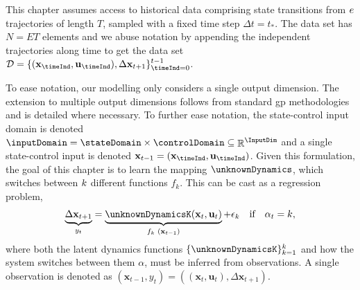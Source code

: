 \documentclass{mimosis-class/mimosis}
\numberwithin{equation}{chapter}
\DeclareMathOperator{\R}{\mathbb{R}}
\newcommand{\numData}{\ensuremath{t}}
\newcommand{\numEpisodes}{\ensuremath{e}}
\newcommand{\modeInd}{\ensuremath{k}}
\newcommand{\NumData}{\ensuremath{\MakeUppercase{\numData}}}
\newcommand{\ModeInd}{\ensuremath{\MakeUppercase{\modeInd}}}
\newcommand{\NumEpisodes}{\MakeUppercase{\numEpisodes}}
\newcommand{\singleData}[1]{\ensuremath{#1_{\numData}}}
\newcommand{\mode}[1]{\ensuremath{#1_{\modeInd}}}
\newcommand{\state}{\ensuremath{\mathbf{x}}}
\newcommand{\control}{\ensuremath{\mathbf{u}}}
\newcommand{\x}{\ensuremath{\mathbf{x}}}
\newcommand{\y}{\ensuremath{y}}
\newcommand{\singleInput}{\ensuremath{\x_{\numData-1}}}
\newcommand{\singleOutput}{\ensuremath{\singleData{\y}}}
\newcommand{\modeVar}{\ensuremath{\alpha}}
\newcommand{\modeVarn}{\ensuremath{\singleData{\modeVar}}}
\newcommand{\modeVarK}{\ensuremath{\modeVarn=\modeInd}}
\newcommand{\latentFunc}{\ensuremath{f}}
\begin{document}
This chapter assumes access to historical data comprising state transitions from \(\NumEpisodes\) trajectories
of length \(T\), sampled  with a  fixed  time step \(\Delta t=t_{*}\).
The data set has \({N=ET}\) elements
and we abuse notation by appending the independent trajectories along
time to get the data set
\(\mathcal{D}=\{(\state_{\timeInd},\control_{\timeInd}),\Delta \state_{t+1}\}^{\NumData-1}_{\timeInd=0}\).

To ease notation, our modelling only considers a single output dimension.
The extension to multiple output dimensions follows from standard \acrshort{gp} methodologies and is detailed where necessary.
To further ease notation, the state-control input domain is denoted
\(\inputDomain = \stateDomain \times \controlDomain \subseteq \R^{\InputDim}\)
and a single state-control input is denoted
\(\singleInput = (\state_{\timeInd},\control_{\timeInd})\).
Given this formulation, the goal of this chapter is to learn the mapping \(\unknownDynamics\),
which switches between \(\ModeInd\) different functions \(\mode{\latentFunc}\).
This can be cast as a regression problem,
\begin{align} \label{eq-multimodal-dynamics-disc-regression}
\underbrace{\Delta \state_{t+1}}_{\text{\singleOutput}}
= \underbrace{\unknownDynamicsK(\state_{t}, \control_{t})}_{\text{\mode{\latentFunc} (\singleInput)}}
+ \mode{\epsilon}
\quad \text{if} \quad \modeVarK,
\end{align}
where both the latent dynamics functions \(\{\unknownDynamicsK\}_{\modeInd=1}^{\ModeInd}\)
and how the system switches between them
\(\modeVar\), must be inferred from observations.
A single observation is denoted as \((\singleInput, \singleOutput) = ((\state_{t},\control_{t}), \Delta \state_{t+1})\).
\end{document}
